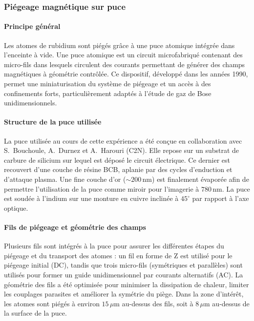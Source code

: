\subsubsection{Piégeage magnétique sur puce}
\label{sec:piegeage_puce}

\paragraph{Principe général}
Les atomes de rubidium sont piégés grâce à une puce atomique intégrée dans l’enceinte à vide. Une puce atomique est un circuit microfabriqué contenant des micro-fils dans lesquels circulent des courants permettant de générer des champs magnétiques à géométrie contrôlée. Ce dispositif, développé dans les années 1990, permet une miniaturisation du système de piégeage et un accès à des confinements forts, particulièrement adaptés à l'étude de gaz de Bose unidimensionnels.

\paragraph{Structure de la puce utilisée}
La puce utilisée au cours de cette expérience a été conçue en collaboration avec S.~Bouchoule, A.~Durnez et A.~Harouri (C2N). Elle repose sur un substrat de carbure de silicium sur lequel est déposé le circuit électrique. Ce dernier est recouvert d’une couche de résine BCB, aplanie par des cycles d’enduction et d’attaque plasma. Une fine couche d’or (\(\sim200\,\mathrm{nm}\)) est finalement évaporée afin de permettre l’utilisation de la puce comme miroir pour l’imagerie à \(780\,\mathrm{nm}\). La puce est soudée à l’indium sur une monture en cuivre inclinée à \(45^\circ\) par rapport à l’axe optique.

\paragraph{Fils de piégeage et géométrie des champs}
Plusieurs fils sont intégrés à la puce pour assurer les différentes étapes du piégeage et du transport des atomes : un fil en forme de Z est utilisé pour le piégeage initial (DC), tandis que trois micro-fils (symétriques et parallèles) sont utilisés pour former un guide unidimensionnel par courants alternatifs (AC). La géométrie des fils a été optimisée pour minimiser la dissipation de chaleur, limiter les couplages parasites et améliorer la symétrie du piège. Dans la zone d’intérêt, les atomes sont piégés à environ \(15\,\mu\mathrm{m}\) au-dessus des fils, soit à \(8\,\mu\mathrm{m}\) au-dessus de la surface de la puce.

